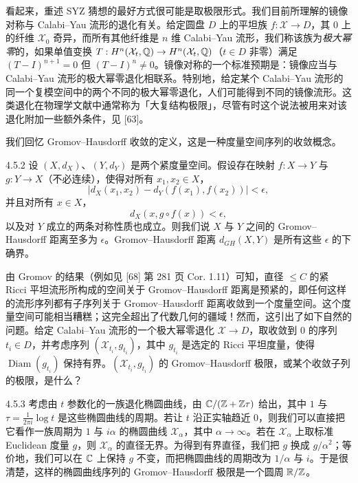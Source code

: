 看起来，重述 SYZ 猜想的最好方式很可能是取极限形式。我们目前所理解的镜像对称与 Calabi--Yau 流形的退化有关。给定圆盘 $D$ 上的平坦族 $f:\mathcal{X}\to D$，其 $0$ 上的纤维 $\mathcal{X}_0$ 奇异，而所有其他纤维是 $n$ 维 Calabi--Yau 流形，我们称该族为\emph{极大幂零}的，如果单值变换 $T:H^n(\mathcal{X}_t,\mathbb{Q})\to H^n(\mathcal{X}_t,\mathbb{Q})$（$t\in D$ 非零）满足 $(T-I)^{n+1}=0$ 但 $(T-I)^n\ne0$。镜像对称的一个标准预期是：镜像应当与 Calabi--Yau 流形的极大幂零退化相联系。特别地，给定某个 Calabi--Yau 流形的同一个复模空间中的两个不同的极大幂零退化，人们可能得到不同的镜像流形。这类退化在物理学文献中通常称为「大复结构极限」，尽管有时这个说法被用来对该退化附加一些额外条件，见 [63]。

我们回忆 Gromov--Hausdorff 收敛的定义，这是一种度量空间序列的收敛概念。

\begin{definition}{4.5.2}
设 $(X,d_X)$、$(Y,d_Y)$ 是两个紧度量空间。假设存在映射 $f:X\to Y$ 与 $g:Y\to X$（不必连续），使得对所有 $x_1,x_2\in X$，
\[
|d_X(x_1,x_2)-d_Y(f(x_1),f(x_2))|<\epsilon,
\]
并且对所有 $x\in X$，
\[
d_X(x,g\circ f(x))<\epsilon,
\]
以及对 $Y$ 成立的两条对称性质也成立。则我们说 $X$ 与 $Y$ 之间的 Gromov--Hausdorff 距离至多为 $\epsilon$。Gromov--Hausdorff 距离 $d_{GH}(X,Y)$ 是所有这些 $\epsilon$ 的下确界。
\end{definition}

由 Gromov 的结果（例如见 [68] 第 281 页 Cor. 1.11）可知，直径 $\le C$ 的紧 Ricci 平坦流形所构成的空间关于 Gromov--Hausdorff 距离是预紧的，即任何这样的流形序列都有子序列关于 Gromov--Hausdorff 距离收敛到一个度量空间。这个度量空间可能相当糟糕；这完全超出了代数几何的疆域！然而，这引出了如下自然的问题。给定 Calabi--Yau 流形的一个极大幂零退化 $\mathcal{X}\to D$，取收敛到 $0$ 的序列 $t_i\in D$，并考虑序列 $(\mathcal{X}_{t_i},g_{t_i})$，其中 $g_{t_i}$ 是选定的 Ricci 平坦度量，使得 $\operatorname{Diam}(g_{t_i})$ 保持有界。$(\mathcal{X}_{t_i},g_{t_i})$ 的 Gromov--Hausdorff 极限，或某个收敛子列的极限，是什么？

\begin{example}{4.5.3}
考虑由 $t$ 参数化的一族退化椭圆曲线，由 $\mathbb{C}/(\mathbb{Z}+\mathbb{Z}\tau)$ 给出，其中 $1$ 与 $\tau=\frac{1}{2\pi i}\log t$ 是这些椭圆曲线的周期。若让 $t$ 沿正实轴趋近 $0$，则我们可以直接把它看作一族周期为 $1$ 与 $i\alpha$ 的椭圆曲线 $\mathcal{X}_\alpha$，其中 $\alpha\to\infty$。若在 $\mathcal{X}_\alpha$ 上取标准 Euclidean 度量 $g$，则 $\mathcal{X}_\alpha$ 的直径无界。为得到有界直径，我们把 $g$ 换成 $g/\alpha^2$；等价地，我们可以在 $\mathbb{C}$ 上保持 $g$ 不变，而把椭圆曲线的周期改为 $1/\alpha$ 与 $i$。于是很清楚，这样的椭圆曲线序列的 Gromov--Hausdorff 极限是一个圆周 $\mathbb{R}/\mathbb{Z}$。
\end{example}

